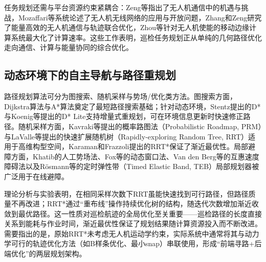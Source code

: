 任务规划还需与平台资源约束紧耦合：Zeng等\cite{zeng2016wireless}指出了无人机通信中的机遇与挑战，Mozaffari等\cite{mozaffari2019tutorial}系统论述了无人机无线网络的应用与开放问题，Zhang和Zeng\cite{zhang2019energy}研究了能量高效的无人机通信与轨迹联合优化，Zhou等\cite{zhou2018computation}针对无人机使能的移动边缘计算系统最大化了计算速率。这些工作表明，巡检任务规划正从单纯的几何路径优化走向通信、计算与能量协同的综合优化。

\subsection{动态环境下的自主导航与路径重规划}

路径规划算法可分为图搜索、随机采样与势场/优化类方法。图搜索方面，Dijkstra算法\cite{dijkstra1959note}与A*算法\cite{hart1968formal}奠定了最短路径搜索基础；针对动态环境，Stentz提出的D*\cite{stentz1994optimal}与Koenig等提出的D* Lite\cite{koenig2002d}支持增量式重规划，可在环境信息更新时快速修正路径。随机采样方面，Kavraki等提出的概率路图法（Probabilistic Roadmap, PRM）\cite{kavraki1996probabilistic}与LaValle等提出的快速扩展随机树（Rapidly-exploring Random Tree, RRT）\cite{lavalle2001randomized}适用于高维构型空间，Karaman和Frazzoli提出的RRT*\cite{karaman2011sampling}保证了渐近最优性。局部避障方面，Khatib的人工势场法\cite{khatib1986real}、Fox等的动态窗口法\cite{fox1997dynamic}、Van den Berg等的互惠速度障碍法\cite{van2011reciprocal}以及Rösmann等的定时弹性带（Timed Elastic Band, TEB）局部规划器\cite{rosmann2017trajectory}被广泛用于在线避障。


理论分析与实验表明\cite{karaman2011sampling}，在相同采样次数下RRT虽能快速找到可行路径，但路径质量不再改进；RRT*通过“重布线”操作持续优化树的结构，随迭代次数增加渐近收敛到最优路径。这一性质对巡检航迹的全局优化至关重要——巡检路径的长度直接关系到能耗与作业时间，渐近最优性保证了规划结果随计算资源投入而不断改进。需要指出的是，原始RRT*未考虑无人机运动学约束，实际系统中通常将其与动力学可行的轨迹优化方法（如B样条优化\cite{usenko2017real}、最小snap\cite{mellinger2011minimum}）串联使用，形成“前端寻路+后端优化”的两层规划架构。

